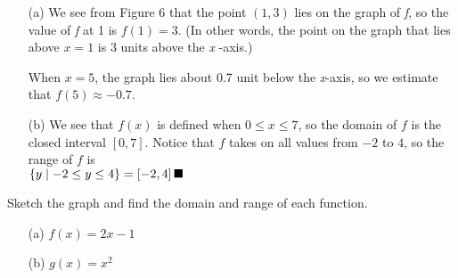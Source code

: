 \documentclass{sebase}
\begin{document}
\begin{Solution}
\thinspace

\begin{enumerate}
\item[(a)] We see from Figure 6 that the point $(1,3)$ lies on the graph of 
\textit{f}, so the value of \textit{f} at 1 is $f(1)=3$. (In other words,
the point on the graph that lies above $x=1$ is $3$ units above the \textit{x%
}-axis.)

\quad When $x=5$, the graph lies about 0.7 unit below the \textit{x}-axis,
so we estimate that $f(5)\approx -0.7$.

\item[(b)] 
We
see that $f\left( x\right) $ is defined when $0\leq x\leq 7$, so the domain
of $f$ is the closed interval $\left[ 0,7\right] $. Notice that $f$ takes on
all values from $-2$ to $4$, so the range of $f$ is%
\enlargethispage{12pt}%
\\[4pt]
$\hspace*{\stretch{2}}\left\{ y\mid -2\leq y\leq 4\right\} =\left[ -2,4%
\right] \hfill \blacksquare $\pagebreak
\end{enumerate}
\end{Solution}

\begin{Example}[2]
Sketch the graph and find the domain and range of each function.

\begin{enumerate}
\item[(a)] $f(x)=2x-1$

\item[(b)] $g(x)=x^{2}$
\end{enumerate}
\end{Example}
\end{document}
